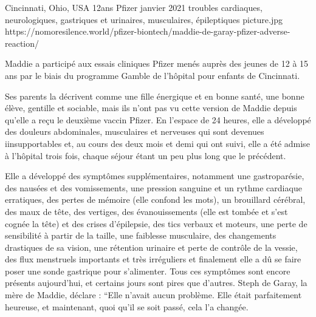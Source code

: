          {Cincinnati, Ohio, USA}
          {12ans}
          {Pfizer}
          {janvier 2021}
          {troubles cardiaques, neurologiques, gastriques et urinaires, musculaires, épileptiques}
          {picture.jpg}
          {https://nomoresilence.world/pfizer-biontech/maddie-de-garay-pfizer-adverse-reaction/}
          {

Maddie a participé aux essais cliniques Pfizer menés auprès des jeunes de 12 à
15 ans par le biais du programme Gamble de l'hôpital pour enfants de Cincinnati.

Ses parents la décrivent comme une fille énergique et en bonne santé, une bonne
élève, gentille et sociable, mais ils n'ont pas vu cette version de Maddie
depuis qu'elle a reçu le deuxième vaccin Pfizer. En l'espace de 24 heures, elle
a développé des douleurs abdominales, musculaires et nerveuses qui sont devenues
iinsupportables et, au cours des deux mois et demi qui ont suivi, elle a été
admise à l'hôpital trois fois, chaque séjour étant un peu plus long que le
précédent.

Elle a développé des symptômes supplémentaires, notamment une gastroparésie, des
nausées et des vomissements, une pression sanguine et un rythme cardiaque
erratiques, des pertes de mémoire (elle confond les mots), un brouillard
cérébral, des maux de tête, des vertiges, des évanouissements (elle est tombée
et s'est cognée la tête) et des crises d'épilepsie, des tics verbaux et moteurs,
une perte de sensibilité à partir de la taille, une faiblesse musculaire, des
changements drastiques de sa vision, une rétention urinaire et perte de contrôle
de la vessie, des flux menstruels importants et très irréguliers et finalement
elle a dû se faire poser une sonde gastrique pour s'alimenter. Tous ces
symptômes sont encore présents aujourd'hui, et certains jours sont pires que
d'autres. Steph de Garay, la mère de Maddie, déclare : “Elle n'avait aucun
problème. Elle était parfaitement heureuse, et maintenant, quoi qu'il se soit
passé, cela l'a changée.

}
